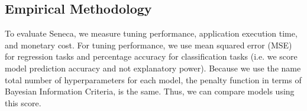 





\subsection{Empirical Methodology}

To evaluate Seneca, we measure tuning performance, application execution time,
and monetary cost.  For tuning performance, we use mean squared error (MSE)
for regression tasks and percentage accuracy for classification tasks (i.e. we score
model prediction accuracy and not explanatory power).  Because we use the name 
total number of hyperparameters for each model, the penalty function in terms of 
Bayesian Information Criteria, is the same. Thus, we can compare models using
this score.

